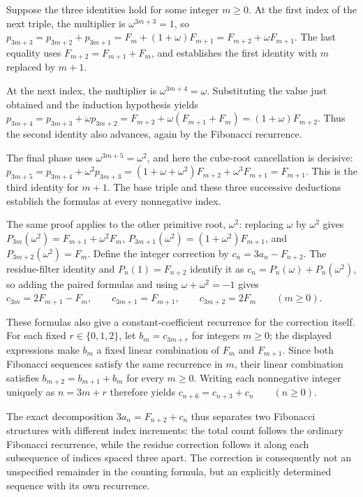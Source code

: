 \documentclass[11pt]{article}
\begin{document}
Suppose the three identities hold for some integer $m\geq 0$. At the first index of the next triple, the multiplier is $\omega^{3m+3}=1$, so
$p_{3m+3}=p_{3m+2}+p_{3m+1}=F_m+(1+\omega)F_{m+1}=F_{m+2}+\omega F_{m+1}.$
The last equality uses $F_{m+2}=F_{m+1}+F_m$, and establishes the first identity with $m$ replaced by $m+1$.

At the next index, the multiplier is $\omega^{3m+4}=\omega$. Substituting the value just obtained and the induction hypothesis yields
$p_{3m+4}=p_{3m+3}+\omega p_{3m+2}=F_{m+2}+\omega(F_{m+1}+F_m)=(1+\omega)F_{m+2}.$
Thus the second identity also advances, again by the Fibonacci recurrence.

The final phase uses $\omega^{3m+5}=\omega^2$, and here the cube-root cancellation is decisive:
$p_{3m+5}=p_{3m+4}+\omega^2p_{3m+3}=(1+\omega+\omega^2)F_{m+2}+\omega^3F_{m+1}=F_{m+1}.$
This is the third identity for $m+1$. The base triple and these three successive deductions establish the formulas at every nonnegative index.

The same proof applies to the other primitive root, $\omega^2$: replacing $\omega$ by $\omega^2$ gives $P_{3m}(\omega^2)=F_{m+1}+\omega^2F_m$, $P_{3m+1}(\omega^2)=(1+\omega^2)F_{m+1}$, and $P_{3m+2}(\omega^2)=F_m$. Define the integer correction by $c_n=3a_n-F_{n+2}$. The residue-filter identity and $P_n(1)=F_{n+2}$ identify it as $c_n=P_n(\omega)+P_n(\omega^2)$, so adding the paired formulas and using $\omega+\omega^2=-1$ gives
$c_{3m}=2F_{m+1}-F_m,\qquad c_{3m+1}=F_{m+1},\qquad c_{3m+2}=2F_m\qquad(m\geq 0).$

These formulas also give a constant-coefficient recurrence for the correction itself. For each fixed $r\in\{0,1,2\}$, let $b_m=c_{3m+r}$ for integers $m\geq 0$; the displayed expressions make $b_m$ a fixed linear combination of $F_m$ and $F_{m+1}$. Since both Fibonacci sequences satisfy the same recurrence in $m$, their linear combination satisfies $b_{m+2}=b_{m+1}+b_m$ for every $m\geq 0$. Writing each nonnegative integer uniquely as $n=3m+r$ therefore yields
$c_{n+6}=c_{n+3}+c_n\qquad(n\geq 0).$

The exact decomposition $3a_n=F_{n+2}+c_n$ thus separates two Fibonacci structures with different index increments: the total count follows the ordinary Fibonacci recurrence, while the residue correction follows it along each subsequence of indices spaced three apart. The correction is consequently not an unspecified remainder in the counting formula, but an explicitly determined sequence with its own recurrence.
\end{document}
